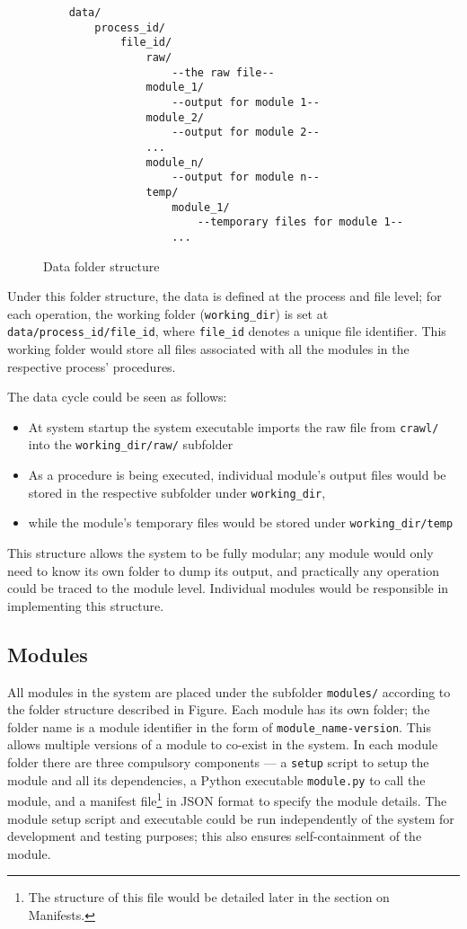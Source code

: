 \begin{figure}[ht]
\begin{lstlisting}
    data/
        process_id/
            file_id/
                raw/
                    --the raw file--
                module_1/
                    --output for module 1--
                module_2/
                    --output for module 2--
                ...
                module_n/
                    --output for module n--
                temp/
                    module_1/
                        --temporary files for module 1--
                    ...
\end{lstlisting}   
\caption{Data folder structure}\label{data} 
\end{figure}

Under this folder structure, the data is defined at the process and file level;
for each operation, the working folder (\texttt{working\_dir}) is set at
\texttt{data/process\_id/file\_id}, where \texttt{file\_id} denotes a unique
file identifier. This working folder would store all files associated with all
the modules in the respective process' procedures.

The data cycle could be seen as follows:

\begin{itemize}
    \item At system startup the system executable imports the raw file from
    \texttt{crawl/} into the \texttt{working\_dir/raw/} subfolder
    \item As a procedure is being executed, individual module's output files
    would be stored in the respective subfolder under \texttt{working\_dir},
    \item while the module's temporary files would be stored under
    \texttt{working\_dir/temp}
\end{itemize}

This structure allows the system to be fully modular; any module would only need
to know its own folder to dump its output, and practically any operation could
be traced to the module level. Individual modules would be responsible in
implementing this structure.

\subsection{Modules}\label{sec:im:arch:mod}

All modules in the system are placed under the subfolder \texttt{modules/}
according to the folder structure described in Figure.
Each module has its own folder; the folder name is a module identifier in
the form of \texttt{module\_name-version}. This allows multiple versions of
a module to co-exist in the system. In each module folder there are three
compulsory components --- a \texttt{setup} script to setup the module and all
its dependencies, a Python executable \texttt{module.py} to call the module,
and a manifest file\footnote{The structure of this file would be detailed later
in the section on Manifests.} in JSON format to specify the module details.
The module setup script and executable could be run independently of the system
for development and testing purposes; this also ensures self-containment of the
module.

